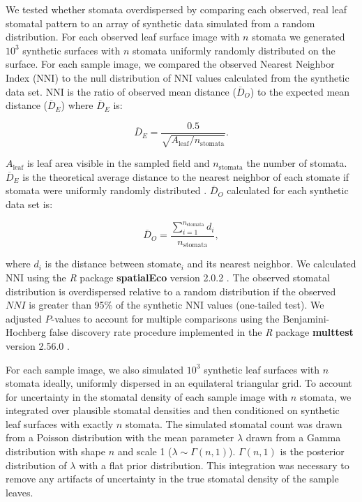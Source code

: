 \documentclass[webpdf,large,modern,unnumsec,namedate]{oup-authoring-template}
\begin{document}
We tested whether stomata overdispersed by comparing each observed, real
leaf stomatal pattern to an array of synthetic data simulated from a
random distribution. For each observed leaf surface image with \(n\)
stomata we generated \(10^3\) synthetic surfaces with \(n\) stomata
uniformly randomly distributed on the surface. For each sample image, we
compared the observed Nearest Neighbor Index (\(\mathrm{NNI}\)) to the
null distribution of \(\mathrm{NNI}\) values calculated from the
synthetic data set. \(\mathrm{NNI}\) is the ratio of observed mean
distance (\(\overline{D}_O\)) to the expected mean distance
(\(\overline{D}_E\)) where \(\overline{D}_E\) is:

\begin{equation}\label{eq:emd}
  \overline{D}_E = \frac{0.5}{\sqrt{A_\text{leaf} / n_\text{stomata}}}.
\end{equation}

\noindent \(A_\text{leaf}\) is leaf area visible in the sampled field
and \(n_\text{stomata}\) the number of stomata. \(\overline{D}_E\) is
the theoretical average distance to the nearest neighbor of each stomate
if stomata were uniformly randomly distributed
\citep{clark_distance_1954}. \(\overline{D}_O\) calculated for each
synthetic data set is:

\begin{equation}\label{eq:omd}
  \overline{D}_O = \frac{\sum_{i=1}^{n_\text{stomata}}d_i}{n_\text{stomata}},
\end{equation}

\noindent where \(d_i\) is the distance between \(\text{stomate}_i\) and
its nearest neighbor. We calculated \(\mathrm{NNI}\) using the \emph{R}
package \textbf{spatialEco} version 2.0.2 \citep{evans_spatialeco_2023}.
The observed stomatal distribution is overdispersed relative to a random
distribution if the observed \(NNI\) is greater than 95\% of the
synthetic \(\mathrm{NNI}\) values (one-tailed test). We adjusted
\(P\)-values to account for multiple comparisons using the
Benjamini-Hochberg \citep{benjamini_controlling_1995} false discovery
rate procedure implemented in the \emph{R} package \textbf{multtest}
version 2.56.0 \citep{wong_multiple_2005}.

For each sample image, we also simulated \(10^3\) synthetic leaf
surfaces with \(n\) stomata ideally, uniformly dispersed in an
equilateral triangular grid. To account for uncertainty in the stomatal
density of each sample image with \(n\) stomata, we integrated over
plausible stomatal densities and then conditioned on synthetic leaf
surfaces with exactly \(n\) stomata. The simulated stomatal count was
drawn from a Poisson distribution with the mean parameter \(\lambda\)
drawn from a Gamma distribution with shape \(n\) and scale 1
(\(\lambda \sim \Gamma(n, 1)\)). \(\Gamma(n, 1)\) is the posterior
distribution of \(\lambda\) with a flat prior distribution. This
integration was necessary to remove any artifacts of uncertainty in the
true stomatal density of the sample leaves.
\end{document}
